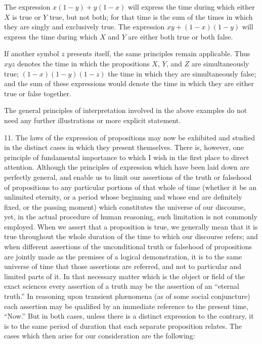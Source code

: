 \documentclass[oneside]{book}
\begin{document}
The expression $x(1-y)+y(1-x)$ will express the time
during which either $X$ is true or $Y$ true, but not both; for that
time is the sum of the times in which they are singly and
exclusively true. The expression $xy+(1-x)(1-y)$ will express the
time during which $X$ and $Y$ are either both true or both false.

If another symbol $z$ presents itself, the same principles remain
applicable. Thus $xyz$ denotes the time in which the propositions
$X$, $Y$, and $Z$ are simultaneously true; $(1-x)(1-y)(1-z)$ the
time in which they are simultaneously false; and the sum of
these expressions would denote the time in which they are either
true or false together.

The general principles of interpretation involved in the above
examples do not need any further illustrations or more explicit
statement.

11. The laws of the expression of propositions may now be
exhibited and studied in the distinct cases in which they present
themselves. There is, however, one principle of fundamental
importance to which I wish in the first place to direct attention.
Although the principles of expression which have been laid down
are perfectly general, and enable us to limit our assertions of the
truth or falsehood of propositions to any particular portions of
that whole of time (whether it be an unlimited eternity, or a
period whose beginning and whose end are definitely fixed, or the
passing moment) which constitutes the universe of our discourse,
yet, in the actual procedure of human reasoning, such limitation
is not commonly employed. When we assert that a proposition
is true, we generally mean that it is true throughout the whole
duration of the time to which our discourse refers; and when
different assertions of the unconditional truth or falsehood of
propositions are jointly made as the premises of a logical demonstration,
it is to the same universe of time that those assertions are
referred, and not to particular and limited parts of it. In that
necessary matter which is the object or field of the exact sciences
every assertion of a truth may be the assertion of an ``eternal
truth.'' In reasoning upon transient ph{\ae}nomena (as of some
social conjuncture) each assertion may be qualified by an
immediate reference to the present time, ``Now.'' But in both cases,
unless there is a distinct expression to the contrary, it is to the
same period of duration that each separate proposition relates.
The cases which then arise for our consideration are the
following:
\end{document}
